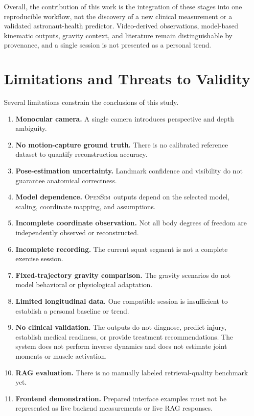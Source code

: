 \documentclass[11pt,a4paper]{article}
\newcommand{\OpenSim}{\textsc{OpenSim}}
\begin{document}
Overall, the contribution of this work is the integration of these stages into one reproducible workflow, not the discovery of a new clinical measurement or a validated astronaut-health predictor. Video-derived observations, model-based kinematic outputs, gravity context, and literature remain distinguishable by provenance, and a single session is not presented as a personal trend.

\section{Limitations and Threats to Validity}

Several limitations constrain the conclusions of this study.

\begin{enumerate}[label=\arabic*.]
  \item \textbf{Monocular camera.} A single camera introduces perspective and depth ambiguity.
  \item \textbf{No motion-capture ground truth.} There is no calibrated reference dataset to quantify reconstruction accuracy.
  \item \textbf{Pose-estimation uncertainty.} Landmark confidence and visibility do not guarantee anatomical correctness.
  \item \textbf{Model dependence.} \OpenSim\ outputs depend on the selected model, scaling, coordinate mapping, and assumptions.
  \item \textbf{Incomplete coordinate observation.} Not all body degrees of freedom are independently observed or reconstructed.
  \item \textbf{Incomplete recording.} The current squat segment is not a complete exercise session.
  \item \textbf{Fixed-trajectory gravity comparison.} The gravity scenarios do not model behavioral or physiological adaptation.
  \item \textbf{Limited longitudinal data.} One compatible session is insufficient to establish a personal baseline or trend.
  \item \textbf{No clinical validation.} The outputs do not diagnose, predict injury, establish medical readiness, or provide treatment recommendations. The system does not perform inverse dynamics and does not estimate joint moments or muscle activation.
  \item \textbf{RAG evaluation.} There is no manually labeled retrieval-quality benchmark yet.
  \item \textbf{Frontend demonstration.} Prepared interface examples must not be represented as live backend measurements or live RAG responses.
\end{enumerate}
\end{document}
